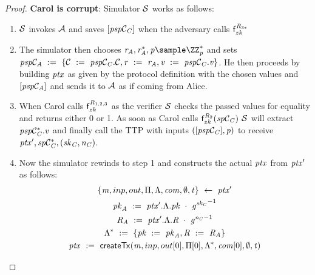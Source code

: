 \begin{proof}
    \textbf{Carol is corrupt}: Simulator $\mathcal{S}$ works as follows:
    \begin{enumerate}
        \item $\mathcal{S}$ invokes $\mathcal{A}$ and saves $[\mathit{psp}\mathcal{C}_{\mathit{C}}]$ when the adversary calls $\mathsf{f}^{\mathit{R}_{3*}}_{zk}$
        \item The simulator then chooses $\varBlindingFactorAlice, \funStar{\varBlindingFactorAlice}, \varFundValue \sample \cnstIntegersPrimeWithoutZero{\varPrime}$ and sets \\ $\mathit{psp}\mathcal{C}_{\mathit{A}} ~:=~ \{ \mathcal{C} ~:=~ \mathit{psp}\mathcal{C}_{\mathit{C}}.\mathcal{C}, \mathit{r} ~:=~ \mathit{r}_{\mathit{A}}, \mathit{v} ~:=~ \mathit{psp}\mathcal{C}_{\mathit{C}}.\mathit{v} \}$.
        He then proceeds by building $\mathit{ptx}$ as given by the protocol definition with the chosen values and $[\mathit{psp}\mathcal{C}_{\mathit{A}}]$ and sends it to $\mathcal{A}$ as if coming from Alice.
        \item When Carol calls $\mathsf{f}^{\mathit{R}_{1,2,3}}_{zk}$ as the verifier $\mathcal{S}$ checks the passed values for equality and returns either 0 or 1.
        As soon as Carol calls $\mathsf{f}^{\mathit{R}_{2}}_{zk}(\mathit{sp}\mathcal{C}_{\mathit{C}})$ $\mathcal{S}$ will extract $\mathit{p} \mathit{sp}\mathcal{C}_{\mathit{C}}^*.\mathit{v}$ and finally call the TTP with inputs $([\mathit{psp}\mathcal{C}_{\mathit{C}}], \mathit{p})$  to receive ${\mathit{ptx}}', \mathit{sp}\mathcal{C}_{\mathit{C}}^*, (\mathit{sk}_{\mathit{C}}, \mathit{\mathit{n}_{\mathit{C}}})$.
        \item Now the simulator rewinds to step 1 and constructs the actual $\mathit{ptx}$ from ${\mathit{ptx}}'$ as follows:
        \begin{gather*}
            \{ \varMsg, \varInputs, \varOutputs, \varProofs, \varSigContext, \varCommits, \cnstEmptySet, \varTime \} \opFunResult \funStarAlt{\varPreTx} \\
            \varPubKeyAlice \opAssign \funStarAlt{\varPreTx}.\varSigContext.\varPubKey \opAddPoint {\funGen{\varSecKeyCarol}}^{-1} \\
            \varRandAlice \opAssign \funStarAlt{\varPreTx}.\varSigContext.\varRand \opAddPoint {\funGen{\varNonceCarol}}^{-1} \\
            \funStar{\varSigContext} \opAssign \{ \varPubKey \opAssign \varPubKeyAlice, \varRand \opAssign \varRandAlice \} \\
            \varPreTx \opAssign \procCreatePreTx{\varMsg}{\varInputs}{\varOutputs[0]}{\varProofs[0]}{\funStar{\varSigContext}}{\varCommits[0]}{\cnstEmptySet}{\varTime}

\end{gather*}
\end{enumerate}
\end{proof}
